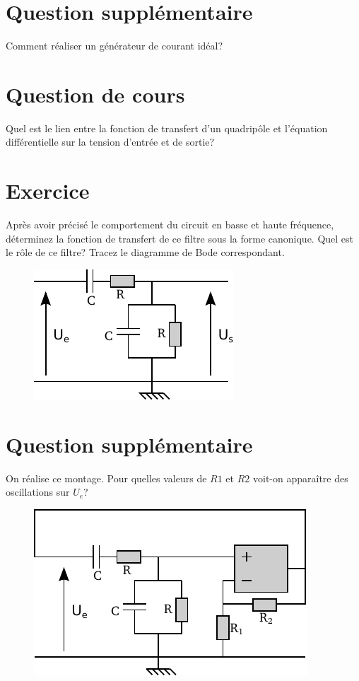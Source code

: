 \documentclass{report}
\begin{document}
\section*{Question supplémentaire}
Comment réaliser un générateur de courant idéal?

\newpage

\section*{Question de cours}

Quel est le lien entre la fonction de transfert d'un quadripôle et l'équation différentielle sur la tension d'entrée et de sortie?
\section*{Exercice}
Après avoir précisé le comportement du circuit en basse et haute fréquence, déterminez la fonction de transfert de ce filtre sous la forme canonique. Quel est le rôle de ce filtre? Tracez le diagramme de Bode correspondant.
\begin{figure}[!h]
\centering
\includegraphics[width=0.5\linewidth]{circuit_1.pdf}
\end{figure}

\section*{Question supplémentaire}

On réalise ce montage. Pour quelles valeurs de $R1$ et $R2$ voit-on apparaître des oscillations sur $U_{e}$?
\begin{figure}[!h]
\centering
\includegraphics[width=0.6\linewidth]{circuit_4.pdf}
\end{figure}
\end{document}
